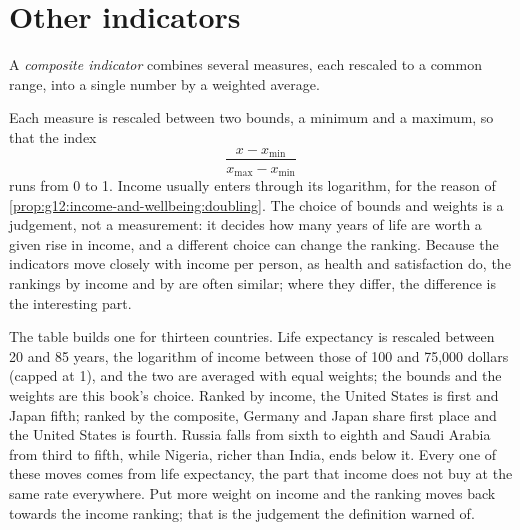 \section{Other indicators}\label{sec:g12:income-and-wellbeing:indicators}

\begin{definition}\label{def:g12:income-and-wellbeing:composite-indicator}
A \emph{composite indicator} combines several measures, each rescaled to a common range, into a single number by a weighted average.
\end{definition}

Each measure is rescaled between two bounds, a minimum and a maximum, so that the index
\[ \frac{x - x_{\min}}{x_{\max} - x_{\min}} \]
runs from 0 to 1. Income usually enters through its
logarithm, for the reason of \cref{prop:g12:income-and-wellbeing:doubling}. The choice of bounds and weights is a judgement, not a measurement: it decides how many years of
life are worth a given rise in income, and a different choice can change the ranking. Because the indicators move closely with income per person, as health and satisfaction do,
the rankings by income and by  are often similar; where they differ, the difference is the interesting part.

The table builds one for thirteen countries. Life expectancy is rescaled between 20 and 85 years, the logarithm of income between those of 100 and 75,000 dollars
(capped at 1), and the two are averaged with equal weights; the bounds and the weights are this book's choice. Ranked by income, the United States is first and Japan
fifth; ranked by the composite, Germany and Japan share first place and the United States is fourth. Russia falls from sixth to eighth and Saudi Arabia from third to
fifth, while Nigeria, richer than India, ends below it. Every one of these moves comes from life expectancy, the part that income does not buy at the same rate
everywhere. Put more weight on income and the ranking moves back towards the income ranking; that is the judgement the definition warned of.

